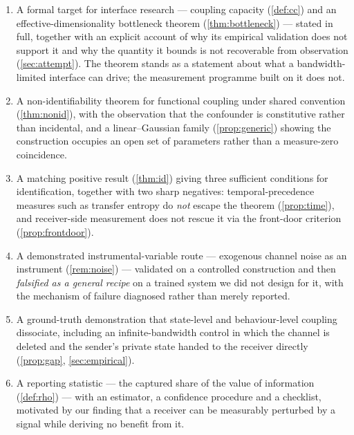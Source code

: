 \documentclass[11pt,a4paper]{article}
\theoremstyle{plain}
\theoremstyle{definition}
\theoremstyle{remark}
\begin{document}
\begin{enumerate}[leftmargin=1.6em, itemsep=3pt]
    \item A formal target for interface research --- coupling capacity (\cref{def:cc}) and an
    effective-dimensionality bottleneck theorem (\cref{thm:bottleneck}) --- stated in full,
    together with an explicit account of why its empirical validation does not support it and
    why the quantity it bounds is not recoverable from observation (\cref{sec:attempt}). The
    theorem stands as a statement about what a bandwidth-limited interface can drive; the
    measurement programme built on it does not.

    \item A non-identifiability theorem for functional coupling under shared convention
    (\cref{thm:nonid}), with the observation that the confounder is constitutive rather than
    incidental, and a linear--Gaussian family (\cref{prop:generic}) showing the construction
    occupies an open set of parameters rather than a measure-zero coincidence.

    \item A matching positive result (\cref{thm:id}) giving three sufficient conditions for
    identification, together with two sharp negatives: temporal-precedence measures such as
    transfer entropy do \emph{not} escape the theorem (\cref{prop:time}), and receiver-side
    measurement does not rescue it via the front-door criterion (\cref{prop:frontdoor}).

    \item A demonstrated instrumental-variable route --- exogenous channel noise as an
    instrument (\cref{rem:noise}) --- validated on a controlled construction and then
    \emph{falsified as a general recipe} on a trained system we did not design for it, with
    the mechanism of failure diagnosed rather than merely reported.

    \item A ground-truth demonstration that state-level and behaviour-level coupling
    dissociate, including an infinite-bandwidth control in which the channel is deleted and
    the sender's private state handed to the receiver directly (\cref{prop:gap},
    \cref{sec:empirical}).

    \item A reporting statistic --- the captured share of the value of information
    (\cref{def:rho}) --- with an estimator, a confidence procedure and a checklist, motivated
    by our finding that a receiver can be measurably perturbed by a signal while deriving no
    benefit from it.


\end{enumerate}
\end{document}
